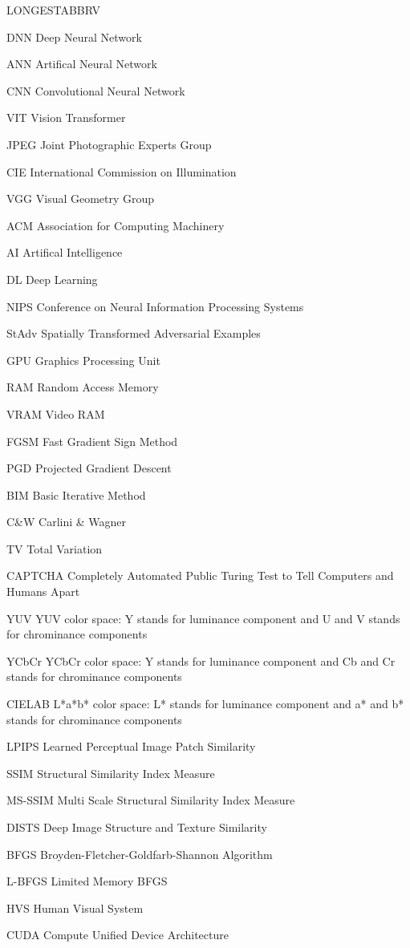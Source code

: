 \begin{theglossary}{LONGESTABBRV}

    \item[DNN] Deep Neural Network
    \item[ANN] Artifical Neural Network
    \item[CNN] Convolutional Neural Network
    \item[VIT] Vision Transformer
    \item[JPEG] Joint Photographic Experts Group
    \item[CIE] International Commission on Illumination
    \item[VGG] Visual Geometry Group
    \item[ACM] Association for Computing Machinery
    \item[AI] Artifical Intelligence
    \item[DL] Deep Learning
    \item[NIPS] Conference on Neural Information Processing Systems
    \item[StAdv] Spatially Transformed Adversarial Examples
    \item[GPU] Graphics Processing Unit
    \item[RAM] Random Access Memory
    \item[VRAM] Video RAM
    \item[FGSM] Fast Gradient Sign Method
    \item[PGD] Projected Gradient Descent
    \item[BIM] Basic Iterative Method
    \item[C\&W] Carlini \& Wagner
    \item[TV] Total Variation
    \item[CAPTCHA] Completely Automated Public Turing Test to Tell Computers and Humans Apart
    \item[YUV] YUV color space: Y stands for luminance component and U and V stands for chrominance components
    \item[YCbCr] YCbCr color space: Y stands for luminance component and Cb and Cr stands for chrominance components
    \item[CIELAB] L*a*b* color space: L* stands for luminance component and a* and b* stands for chrominance components
    \item[LPIPS] Learned Perceptual Image Patch Similarity
    \item[SSIM] Structural Similarity Index Measure
    \item[MS-SSIM] Multi Scale Structural Similarity Index Measure
    \item[DISTS] Deep Image Structure and Texture Similarity
    \item[BFGS] Broyden-Fletcher-Goldfarb-Shannon Algorithm
    \item[L-BFGS] Limited Memory BFGS
    \item[HVS] Human Visual System
    \item[CUDA] Compute Unified Device Architecture


\end{theglossary}
